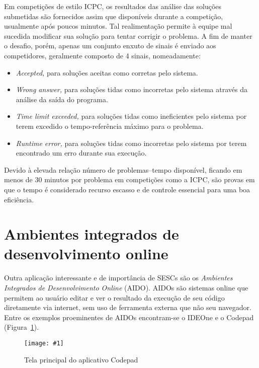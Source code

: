 \documentclass[ruledheader, 12pt]{abnt}
\newcommand{\figcustom}[4]{\par
	\begin{figure}[#3]
		\centering
		\texttt{[image: \#1]}
		\caption{\label{fig:#1}#2}
	\end{figure}
\par}
\newcommand{\fig}[2]{\figcustom{#1}{#2}{bp}{1}}
\newcommand{\figref}[1]{(Figura~\ref{fig:#1})}
\begin{document}
Em competições de estilo ICPC, os resultados das análise das soluções submetidas são fornecidos assim que disponíveis durante a competição, usualmente após poucos minutos. Tal realimentação permite à equipe mal sucedida modificar sua solução para tentar corrigir o problema. A fim de manter o desafio, porém, apenas um conjunto enxuto de sinais é enviado aos competidores, geralmente composto de 4 sinais, nomeadamente:
\begin{itemize}
	\item \emph{Accepted,} para soluções aceitas como corretas pelo sistema.
	\item \emph{Wrong answer,} para soluções tidas como incorretas pelo sistema através da análise da saída do programa.
	\item \emph{Time limit exceeded,} para soluções tidas como ineficientes pelo sistema por terem excedido o tempo-referência máximo para o problema.
	\item \emph{Runtime error,} para soluções tidas como incorretas pelo sistema por terem encontrado um erro durante sua execução.
\end{itemize}

Devido à elevada relação número de problemas--tempo disponível, ficando em menos de 30 minutos por problema em competições como a ICPC, são provas em que o tempo é considerado recurso escasso e de controle essencial para uma boa eficiência.

\clearpage
\section{Ambientes integrados de desenvolvimento online}


Outra aplicação interessante e de importância de SESCs são os \emph{Ambientes Integrados de Desenvolvimento Online} (AIDO). AIDOs são sistemas online que permitem ao usuário editar e ver o resultado da execução de seu código diretamente via internet, sem uso de ferramenta externa que não seu navegador. Entre os exemplos proeminentes de AIDOs encontram-se o IDEOne \cite{ideoneabout} e o Codepad \cite{codepadabout} \figref{codepad}.

\fig{codepad}{Tela principal do aplicativo Codepad}
\end{document}
